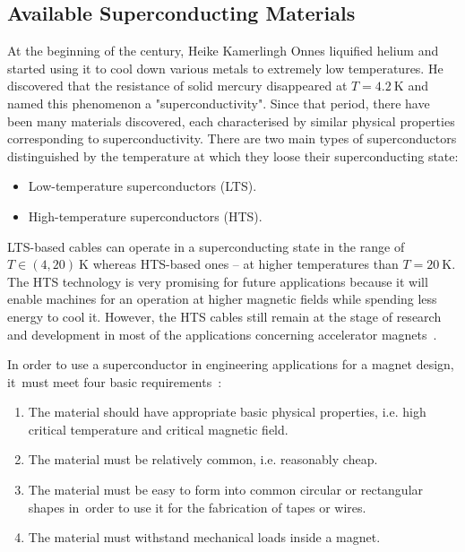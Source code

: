 
\subsection{Available Superconducting Materials}

At the beginning of the  century, Heike Kamerlingh Onnes liquified helium and started using it to cool down various metals to extremely low temperatures. He discovered that the resistance of solid mercury disappeared at $T=4.2~\text{K}$ and named this phenomenon a "superconductivity". Since that period, there have been many materials discovered, each characterised by similar physical properties corresponding to superconductivity. There are two main types of superconductors distinguished by the temperature at which they loose their superconducting state: 
\begin{itemize}
    \item Low-temperature superconductors (LTS).
    \item High-temperature superconductors (HTS).
\end{itemize}
LTS-based cables can operate in a superconducting state in the range of $T \in (4, 20)~\text{K}$ whereas HTS-based ones -- at higher temperatures than $T=20~\text{K}$. The HTS technology is very promising for future applications because it will enable machines for an operation at higher magnetic fields while spending less energy to cool it. However, the HTS cables still remain at the stage of research and development in most of the applications concerning accelerator magnets~\cite[p.~77-95]{evans_marvel_of_technology}. 

In order to use a superconductor in engineering applications for a magnet design, it~must meet four basic requirements~\cite[p.~77-95]{evans_marvel_of_technology}:

\begin{enumerate}
    \item The material should have appropriate basic physical properties, i.e. high critical temperature and critical magnetic field.
    \item The material must be relatively common, i.e. reasonably cheap.
    \item The material must be easy to form into common circular or rectangular shapes in~order to use it for the fabrication of tapes or wires.
    \item The material must withstand mechanical loads inside a magnet.
\end{enumerate}

